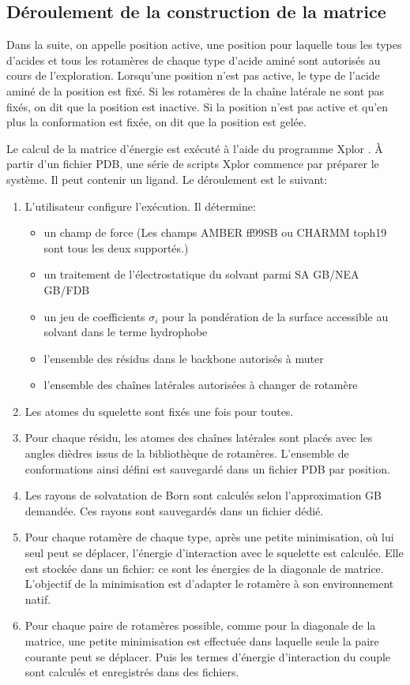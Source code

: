 \subsection{Déroulement de la construction de la matrice}
\label{sub:matrix}
Dans la suite, on appelle position active, une position pour laquelle tous les types d'acides et tous les rotamères de chaque type d'acide aminé sont autorisés au cours de l'exploration. Lorsqu'une position n'est pas active, le type de l'acide aminé de la position est fixé. Si les rotamères de la chaîne latérale ne sont pas fixés, on dit que la position est inactive. Si la position n'est pas active et qu'en plus la conformation est fixée, on dit que la position est gelée.

Le calcul de la matrice d'énergie est exécuté à l'aide du programme Xplor \cite{Xplor}. À partir d'un fichier PDB, une série de scripts Xplor commence par préparer le système. Il peut contenir un ligand. Le déroulement est le suivant:

\begin{enumerate}[leftmargin=*]
\item L'utilisateur configure l'exécution. Il détermine:
\begin{itemize}
\item un champ de force (Les champs AMBER ff99SB ou CHARMM toph19 sont tous les deux supportés.)
\item un traitement de l'électrostatique du solvant parmi SA GB/NEA GB/FDB
\item un jeu de coefficients $\sigma_i$ pour la pondération de la surface accessible au solvant dans le terme hydrophobe
\item l'ensemble des résidus dans le backbone autorisés à muter
\item l'ensemble des chaînes latérales autorisées à changer de rotamère 
\end{itemize}
\item Les atomes du squelette sont fixés une fois pour toutes.
\item Pour chaque résidu, les atomes des chaînes latérales sont placés avec les angles dièdres issus de la bibliothèque de rotamères. L'ensemble de conformations ainsi défini est sauvegardé dans un fichier PDB par position.
\item Les rayons de solvatation de Born sont calculés selon l'approximation GB demandée. Ces rayons sont sauvegardés dans un fichier dédié.
\item Pour chaque rotamère de chaque type, après une petite minimisation, où lui seul peut se déplacer, l'énergie d'interaction avec le squelette est calculée. Elle est stockée dans un fichier: ce sont les énergies de la diagonale de matrice. L'objectif de la minimisation est d'adapter le rotamère à son environnement natif.
\item Pour chaque paire de rotamères possible, comme pour la diagonale de la matrice, une petite minimisation est effectuée dans laquelle seule la paire courante peut se déplacer. Puis les termes d'énergie d'interaction du couple sont calculés et enregistrés dans des fichiers.  
\end{enumerate}

